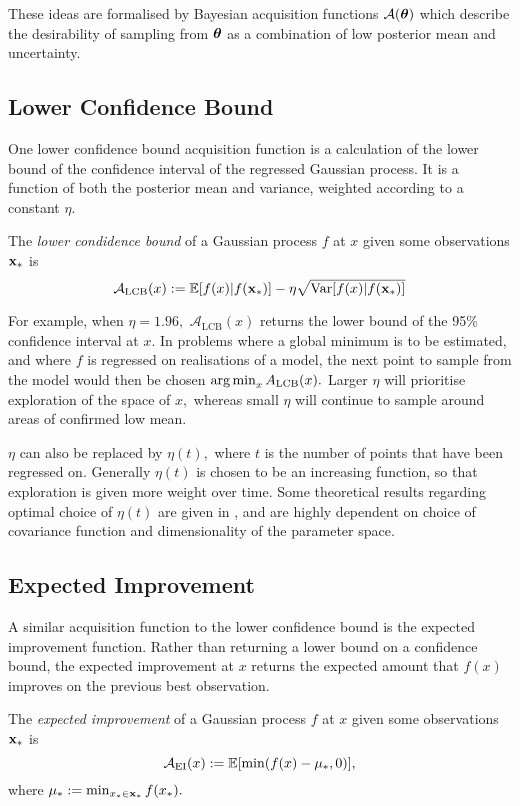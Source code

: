 These ideas are
formalised by Bayesian acquisition functions $\mathcal{A}(\bm{\theta})$ which
describe the desirability of sampling from $\bm{\theta}$ as a combination of low
posterior mean and uncertainty.

\subsection*{Lower Confidence Bound}

One lower confidence bound acquisition function is a calculation of the lower
bound of the confidence interval of the regressed Gaussian process. It is a 
function of both the posterior mean and variance, weighted according to a
constant $\eta.$

\begin{definition}
    The \emph{lower condidence bound} of a Gaussian process $f$ at $x$ given
    some observations $\mathbf{x}_*$ is
    $$
        \mathcal{A}_\mathrm{LCB}(x)
        := \operatorname{\mathbb{E}}[f(x) | f(\mathbf{x}_*)]
        - \eta \sqrt{\mathrm{Var}[f(x) | f(\mathbf{x}_*)]}
    $$
\end{definition}

For example, when $\eta = 1.96,$ $\mathcal{A}_\text{LCB}(x)$ returns the lower
bound of the 95\% confidence interval at $x.$ In problems where a global 
minimum is to be estimated, and where $f$ is regressed on realisations of
a model, the next point to sample from the
model would then be chosen $\operatorname*{arg\,min}_{x} A_\mathrm{LCB}(x).$ 
Larger $\eta$ will prioritise
exploration of the space of $x,$ whereas small $\eta$ will continue to sample 
around areas of confirmed low mean.

$\eta$ can also be replaced by
$\eta(t),$ where $t$ is the number of points that have been regressed on.
Generally $\eta(t)$ is chosen to be an increasing function, so that exploration
is given more weight over time. Some theoretical results regarding optimal
choice of
$\eta(t)$ are given in \cite{srinivas_gaussian_2010}, and are highly dependent
on choice of covariance function and dimensionality of the parameter space.

\subsection*{Expected Improvement}

A similar acquisition function to the lower confidence bound is the expected
improvement function. Rather than returning a lower bound on a confidence
bound, the expected improvement at $x$ returns the expected amount that
$f(x)$ improves on the previous best observation.
\begin{definition}
    The \emph{expected improvement} of a Gaussian process $f$ at $x$ given
    some observations $\mathbf{x}_*$ is
    $$
        \mathcal{A}_\mathrm{EI}(x)
        := \operatorname{\mathbb{E}}[\min(f(x) - \mu_*, 0)],
    $$ where $\mu_* := \min_{x_*\in\mathbf{x}_*}f(x_*).$
\end{definition}

